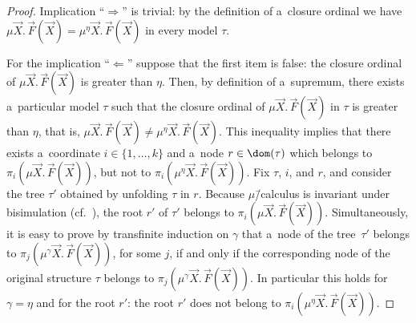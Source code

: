 \documentclass{lmcs}
\numberwithin{equation}{section}
\numberwithin{figure}{section}
\begin{document}
\begin{proof}
	Implication ``$\Rightarrow$'' is trivial: by the definition of a~closure ordinal we have $\mu\vec{X}.\,\vec{F}(\vec{X})=\mu^\eta\vec{X}.\,\vec{F}(\vec{X})$ in every model $\tau$.
	
	For the implication ``$\Leftarrow$'' suppose that the first item is false: the closure ordinal of $\mu\vec{X}.\,\vec{F}(\vec{X})$ is greater than $\eta$.
	Then, by definition of a~supremum, there exists a~particular model $\tau$ such that the closure ordinal of $\mu\vec{X}.\,\vec{F}(\vec{X})$ in $\tau$ is greater than $\eta$,
	that is, $\mu\vec{X}.\,\vec{F}(\vec{X})\neq\mu^\eta\vec{X}.\,\vec{F}(\vec{X})$.
	This inequality implies that there exists a~coordinate $i\in\{1,\dots,k\}$ and a~node $r\in\dom(\tau)$ which belongs to $\pi_i(\mu\vec{X}.\,\vec{F}(\vec{X}))$, but not to $\pi_i(\mu^\eta\vec{X}.\,\vec{F}(\vec{X}))$.
	Fix $\tau$, $i$, and $r$, and consider the tree $\tau'$ obtained by unfolding $\tau$ in $r$.
	Because $\mu$\=/calculus is invariant under bisimulation
	(cf.~\cite[Section~26.3.1]{julian-igor-handook}), the root $r'$ of $\tau'$ belongs to $\pi_i(\mu\vec{X}.\,\vec{F}(\vec{X}))$.
	Simultaneously, it is easy to prove by transfinite induction on $\gamma$ that a~node of the tree~$\tau'$ belongs to $\pi_j(\mu^\gamma\vec{X}.\,\vec{F}(\vec{X}))$, for some $j$,
	if and only if the corresponding node of the original structure $\tau$ belongs to $\pi_j(\mu^\gamma\vec{X}.\,\vec{F}(\vec{X}))$.
	In particular this holds for $\gamma=\eta$ and for the root $r'$: the root $r'$ does not belong to $\pi_i(\mu^\eta\vec{X}.\,\vec{F}(\vec{X}))$.
	

\end{proof}
\end{document}
